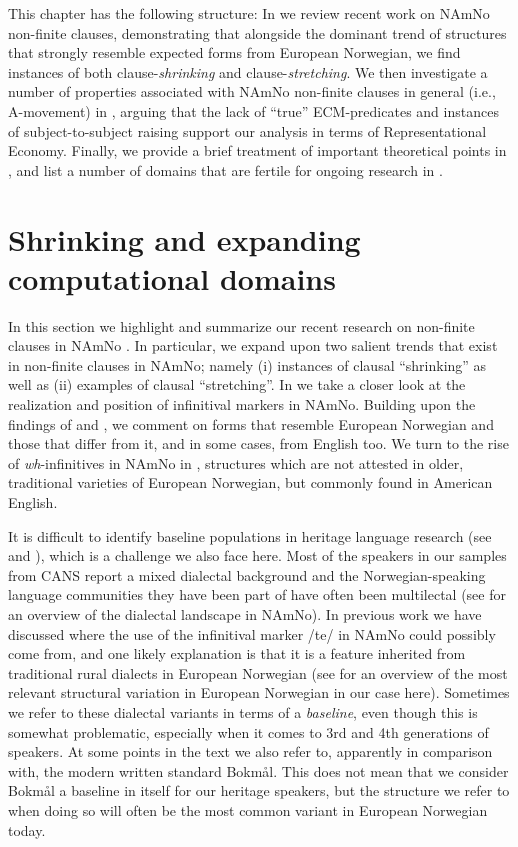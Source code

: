 \documentclass[output=paper,colorlinks,citecolor=brown]{langscibook}
\begin{document}
This chapter has the following structure: In  we review recent work on NAmNo non-finite clauses, demonstrating that alongside the dominant trend of structures that strongly resemble expected forms from European Norwegian, we find instances of both clause-\textit{shrinking} and clause-\textit{stretching}. We then investigate a number of properties associated with NAmNo non-finite clauses in general (i.e., A-movement) in , arguing that the lack of “true” ECM-predicates and instances of subject-to-subject raising support our analysis in terms of Representational Economy. Finally, we provide a brief treatment of important theoretical points in , and list a number of domains that are fertile for ongoing research in . 

\section{Shrinking and expanding computational domains} \label{section-shrink}

In this section we highlight and summarize our recent research on non-finite clauses in NAmNo \citep{Softelandetal2021,putsoft,putsoft23}. In particular, we expand upon two salient trends that exist in non-finite clauses in NAmNo; namely (i) instances of clausal “shrinking” as well as (ii) examples of clausal “stretching”. In  we take a closer look at the realization and position of infinitival markers in NAmNo. Building upon the findings of \citet{Softelandetal2021} and \citet{putsoft}, we comment on forms that resemble European Norwegian and those that differ from it, and in some cases, from English too. We turn to the rise of \textit{wh}-infinitives in NAmNo in , structures which are not attested in older, traditional varieties of European Norwegian, but commonly found in American English. 

It is difficult to identify baseline populations in heritage language research (see \citealt[Section 1.4]{polinsky18} and \citealt{roberta21}), which is a challenge we also face here. Most of the speakers in our samples from CANS report a mixed dialectal background and the Norwegian-speaking language communities they have been part of have often been multilectal (see  for an overview of the dialectal landscape in NAmNo). In previous work we have discussed where the use of the infinitival marker /te/ in NAmNo could possibly come from, and one likely explanation is that it is a feature inherited from traditional rural dialects in European Norwegian (see \citealt{Softelandetal2021} for an overview of the most relevant structural variation in European Norwegian in our case here). Sometimes we refer to these dialectal variants in terms of a \textit{baseline}, even though this is somewhat problematic, especially when it comes to 3rd and 4th generations of speakers. At some points in the text we also refer to, apparently in comparison with, the modern written standard Bokmål. This does not mean that we consider Bokmål a baseline in itself for our heritage speakers, but the structure we refer to when doing so will often be the most common variant in European Norwegian today.
\end{document}

